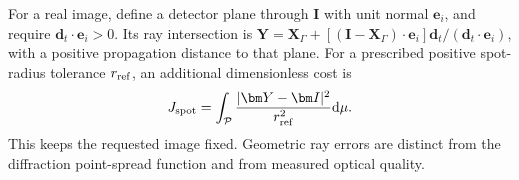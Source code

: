 For a real image, define a detector plane through $\bm I$ with unit normal
$\bm e_i$, and require $\bm d_t\cdot\bm e_i>0$. Its ray intersection is
$\bm Y=\bm X_\Gamma+[(\bm I-\bm X_\Gamma)\cdot\bm e_i]
\bm d_t/(\bm d_t\cdot\bm e_i)$, with a positive propagation distance to that
plane. For a prescribed positive spot-radius tolerance
$r_{\rm ref}$, an additional dimensionless cost is
\begin{equation}
 J_{\rm spot}=\int_{\mathcal P}
       \frac{|\bm Y-\bm I|^2}{r_{\rm ref}^2}\mathrm d\mu.
 \label{eq:spot-cost}
\end{equation}
This keeps the requested image fixed. Geometric ray errors are distinct from
the diffraction point-spread function and from measured optical quality.
